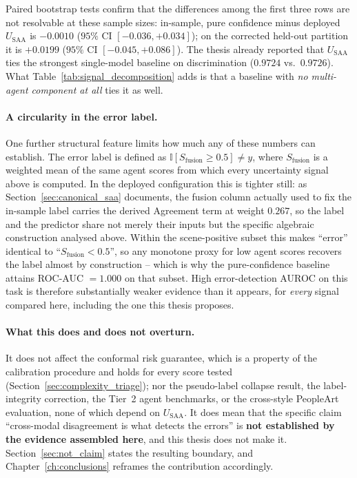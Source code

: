 \documentclass[12pt,a4paper]{report}
\begin{document}
Paired bootstrap tests confirm that the differences among the first three rows are not resolvable at these sample sizes: in-sample, pure confidence minus deployed $U_{\text{SAA}}$ is $-0.0010$ ($95\%$ CI $[-0.036, +0.034]$); on the corrected held-out partition it is $+0.0199$ ($95\%$ CI $[-0.045, +0.086]$). The thesis already reported that $U_{\text{SAA}}$ ties the strongest single-model baseline on discrimination ($0.9724$ vs.\ $0.9726$). What Table~\ref{tab:signal_decomposition} adds is that a baseline with \emph{no multi-agent component at all} ties it as well.

\paragraph{A circularity in the error label.} One further structural feature limits how much any of these numbers can establish. The error label is defined as $\mathbb{I}[S_{\text{fusion}} \ge 0.5] \ne y$, where $S_{\text{fusion}}$ is a weighted mean of the same agent scores from which every uncertainty signal above is computed. In the deployed configuration this is tighter still: as Section~\ref{sec:canonical_saa} documents, the fusion column actually used to fix the in-sample label carries the derived Agreement term at weight $0.267$, so the label and the predictor share not merely their inputs but the specific algebraic construction analysed above. Within the scene-positive subset this makes ``error'' identical to ``$S_{\text{fusion}} < 0.5$'', so any monotone proxy for low agent scores recovers the label almost by construction -- which is why the pure-confidence baseline attains ROC-AUC $=1.000$ on that subset. High error-detection AUROC on this task is therefore substantially weaker evidence than it appears, for \emph{every} signal compared here, including the one this thesis proposes.

\paragraph{What this does and does not overturn.} It does not affect the conformal risk guarantee, which is a property of the calibration procedure and holds for every score tested (Section~\ref{sec:complexity_triage}); nor the pseudo-label collapse result, the label-integrity correction, the Tier~2 agent benchmarks, or the cross-style PeopleArt evaluation, none of which depend on $U_{\text{SAA}}$. It does mean that the specific claim ``cross-modal disagreement is what detects the errors'' is \textbf{not established by the evidence assembled here}, and this thesis does not make it. Section~\ref{sec:not_claim} states the resulting boundary, and Chapter~\ref{ch:conclusions} reframes the contribution accordingly.
\end{document}
